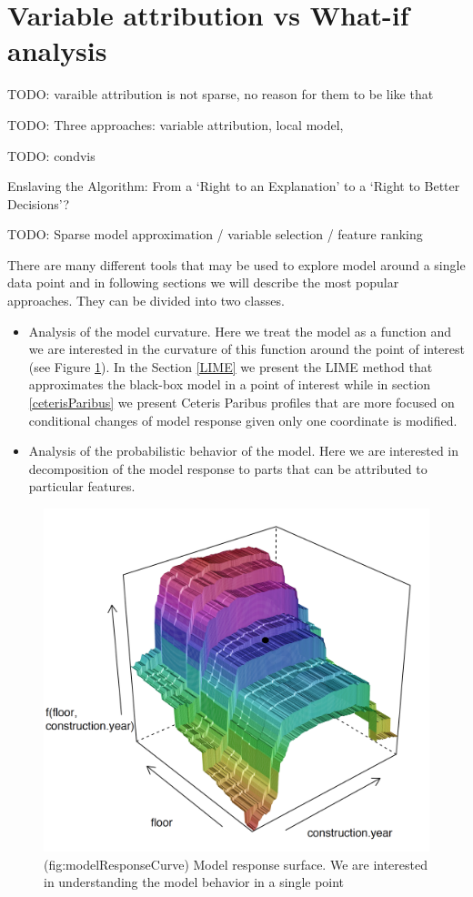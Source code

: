 \documentclass[]{book}
\providecommand{\tightlist}{%
  \setlength{\itemsep}{0pt}\setlength{\parskip}{0pt}}
\theoremstyle{definition}
\theoremstyle{definition}
\theoremstyle{definition}
\theoremstyle{remark}
\begin{document}
\hypertarget{variable-attribution-vs-what-if-analysis}{%
\section{Variable attribution vs What-if
analysis}\label{variable-attribution-vs-what-if-analysis}}

TODO: varaible attribution is not sparse, no reason for them to be like
that

TODO: Three approaches: variable attribution, local model,

TODO: condvis \citep{JSSv081i05}

Enslaving the Algorithm: From a `Right to an Explanation' to a `Right to
Better Decisions'? \citep{Edwards_Veale_2018}

TODO: Sparse model approximation / variable selection / feature ranking

There are many different tools that may be used to explore model around
a single data point and in following sections we will describe the most
popular approaches. They can be divided into two classes.

\begin{itemize}
\tightlist
\item
  Analysis of the model curvature. Here we treat the model as a function
  and we are interested in the curvature of this function around the
  point of interest (see Figure \ref{fig:modelResponseCurve}). In the
  Section \ref{LIME} we present the LIME method that approximates the
  black-box model in a point of interest while in section
  \ref{ceterisParibus} we present Ceteris Paribus profiles that are more
  focused on conditional changes of model response given only one
  coordinate is modified.
\item
  Analysis of the probabilistic behavior of the model. Here we are
  interested in decomposition of the model response to parts that can be
  attributed to particular features.
\end{itemize}

\begin{figure}
\includegraphics[width=0.7\linewidth]{figure/model_response} \caption{(fig:modelResponseCurve) Model response surface. We are interested in understanding the model behavior in a single point}\label{fig:modelResponseCurve}
\end{figure}
\end{document}
